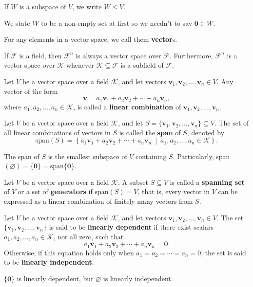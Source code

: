 \begin{notationenv}
	If $W$ is a subspace of $V$, we write $W \leq V$.
\end{notationenv}
\begin{remarkenv}
	We state $W$ to be a non-empty set at first so we needn't to say $\bm{0}\in W$.
\end{remarkenv}
\begin{remarkenv}
	For any elements in a vector space, we call them \textbf{vector}s.
\end{remarkenv}
\begin{exampleenv}
	If $\mathcal{F}$ is a field, then $\mathcal{F}^n$ is always a vector space over $\mathcal{F}$. Furthermore, $\mathcal{F}^n$ is a vector space over $\mathcal{K}$ whenever $\mathcal{K}\subseteq \mathcal{F}$ is a subfield of $\mathcal{F}$.
\end{exampleenv}
\begin{definitionenv}
	Let $V$ be a vector space over a field $\mathcal{K}$, and let vectors
	$\bm{v}_1, \bm{v}_2, \dots, \bm{v}_n \in V$.
	Any vector of the form
	\[
	\bm{v} = a_1 \bm{v}_1 + a_2 \bm{v}_2 + \cdots + a_n \bm{v}_n,
	\]
	where $a_1, a_2, \dots, a_n \in \mathcal{K}$, is called a \textbf{linear combination} of
	$\bm{v}_1, \bm{v}_2, \dots, \bm{v}_n$.
\end{definitionenv}
\begin{definitionenv}
	Let $V$ be a vector space over a field $\mathcal{K}$, and let
	$S = \{\bm{v}_1, \bm{v}_2, \dots, \bm{v}_n\} \subseteq V$.
	The set of all linear combinations of vectors in $S$ is called the
	\textbf{span} of $S$, denoted by
	\[
	\mathrm{span}(S) =
	\left\{
	a_1 \bm{v}_1 + a_2 \bm{v}_2 + \cdots + a_n \bm{v}_n
	\ \middle| \ a_1, a_2, \dots, a_n \in \mathcal{K}
	\right\}.
	\]
\end{definitionenv}
\begin{theoremenv}
	The span of $S$ is the smallest subspace of $V$ containing $S$. Particularly, span$(\varnothing)=\{\bm{0}\}=\text{span}\{\bm{0}\}$.
\end{theoremenv}
\begin{definitionenv}
	Let $V$ be a vector space over a field $\mathcal{K}$.
	A subset $S \subseteq V$ is called a \textbf{spanning set} of $V$ or a set of \textbf{generators}
	if $\mathrm{span}(S) = V$, that is, every vector in $V$ can be expressed
	as a linear combination of finitely many vectors from $S$.
\end{definitionenv}
\begin{definitionenv}
	Let $V$ be a vector space over a field $\mathcal{K}$, and let vectors
	$\bm{v}_1, \bm{v}_2, \dots, \bm{v}_n \in V$.
	The set $\{\bm{v}_1, \bm{v}_2, \dots, \bm{v}_n\}$ is said to be
	\textbf{linearly dependent} if there exist scalars
	$a_1, a_2, \dots, a_n \in \mathcal{K}$, not all zero, such that
	\[
	a_1 \bm{v}_1 + a_2 \bm{v}_2 + \cdots + a_n \bm{v}_n = \bm{0}.
	\]
	Otherwise, if this equation holds only when
	$a_1 = a_2 = \cdots = a_n = 0$, the set is said to be
	\textbf{linearly independent}.
\end{definitionenv}
\begin{remarkenv}
	$\{\bm{0}\}$ is linearly dependent, but $\varnothing$ is linearly independent.
\end{remarkenv}


